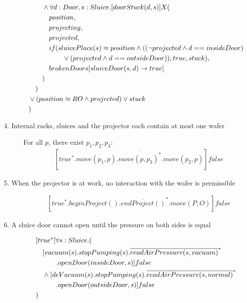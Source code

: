 \begin{description}
\begin{align*}
&  \tab\tab  \wedge \forall d:Door,s:Sluice.[doorStuck(d, s)]X( \\
&  \tab\tab                        \tab                        position, \\
&  \tab\tab                        \tab                        projecting, \\
&  \tab\tab                        \tab                        projected, \\
&  \tab\tab                        \tab                        if(sluicePlace(s) \approx position \wedge ((\neg projected \wedge d == insideDoor) \\
& \tab\tab\tab\tab\tab \vee (projected \wedge d == outsideDoor)), true, stuck), \\
&  \tab\tab                       \tab brokenDoors[sluiceDoor(s,d)\to true] \\
&  \tab\tab                                              ) \\
&  \tab ) \\
&  \vee (position \approx RO \wedge projected) \vee stuck \\
&)
	\end{align*}

 
 \item[4. Internal racks, sluices and the projector each contain at most one wafer]
    
    For all $p$, there exist $p_1, p_2, p_3$:
	\begin{align*}
		&[true^*.move(p_1, p).\overline{move(p,p_3)^*}.move(p_2,p)]false
	\end{align*}

 
 \item[5. When the projector is at work, no interaction with the wafer is permissible]
 	\begin{align*}
 		&[true^*.beginProject().\overline{endProject()}^*.move(P,O)]false
	\end{align*}
	
 \item[6. A sluice door cannot open until the pressure on both sides is equal]
	\begin{align*}
&[true^*]\forall s:Sluice . ( \\
&\tab  [vacuum(s).stopPumping(s).\overline{readAirPressure(s, vacuum)}^*\\
&\tab\tab\tab.openDoor(insideDoor,s)]false \\
&\tab  \wedge [deVacuum(s).stopPumping(s).\overline{readAirPressure(s, normal)}^*\\
&\tab\tab\tab.openDoor(outsideDoor,s)]false \\
&)		
	\end{align*}
	

\end{description}
